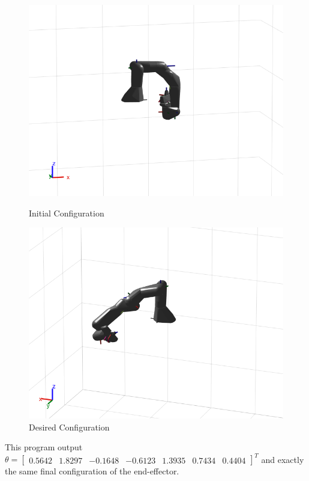 \documentclass[english,10pt,a4paper]{article}
\begin{document}
    \begin{figure}[H]
        \centering
        \begin{minipage}{0.45\textwidth}
            \centering
            \includegraphics[width=\textwidth]{ph1a.png} %
            \caption{Initial Configuration}
            \label{fig:ph1a}
        \end{minipage}
        \hfill
        \begin{minipage}{0.45\textwidth}
        \centering
            \includegraphics[width=\textwidth]{ph1b.png} %
            \caption{Desired Configuration}
            \label{fig:ph1b}
        \end{minipage}
    \end{figure}
    This program output \(\theta = \begin{bmatrix} 0.5642 & 1.8297 & -0.1648 & -0.6123 & 1.3935 & 0.7434 & 0.4404 \end{bmatrix}^T\) and exactly the same final configuration of the end-effector.
    
\end{document}
